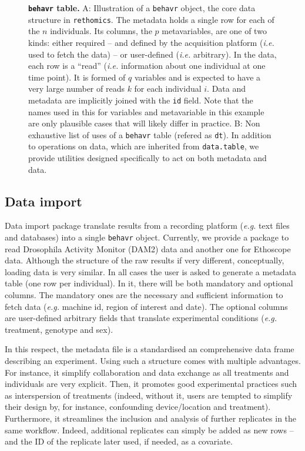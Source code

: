 \documentclass[10pt,letterpaper]{article}\usepackage[]{graphicx}\usepackage[]{color}
\begin{document}
\begin{figure}[!h]
	\caption{{\bf \texttt{behavr} table.}
	A: Illustration of a \texttt{behavr} object, the core data structure in \texttt{rethomics}.
		The metadata holds a single row for each of the $n$ individuals. 
		Its columns, the $p$ metavariables, are one of two kinds: either required -- and defined by the acquisition platform (\emph{i.e.} used to fetch the data) -- or user-defined (\emph{i.e.} arbitrary).
		In the data, each row is a ``read'' (\emph{i.e.} information about one individual at one time point).
		It is formed of $q$ variables and is expected to have a very large number of reads $k$ for each individual $i$.
		Data and metadata are implicitly joined with the \texttt{id} field.
		Note that the names used in this for variables and metavariable in this example are only plausible cases that will likely differ in practice. 
		B: Non exhaustive list of uses of a \texttt{behavr} table (refered as \texttt{dt}). 
		In addition to operations on data, which are inherited from \texttt{data.table},
		we provide utilities designed specifically to act on both metadata and data.  
	}
	\label{fig:fig-2}
\end{figure}

\subsection*{Data import}
Data import package translate results from a recording platform (\emph{e.g.} text files and databases) into a single \texttt{behavr} object.
Currently, we provide a package to read Drosophila Activity Monitor (DAM2) data and another one for Ethoscope data.
Although the structure of the raw results if very different, conceptually, loading data is very similar.
In all cases the user is asked to generate a metadata table (one row per individual). 
In it, there will be both mandatory and optional columns.
The mandatory ones are the necessary and sufficient information to fetch data (\emph{e.g.} machine id, region of interest and date). 
The optional columns are user-defined arbitrary fields that translate experimental conditions (\emph{e.g.} treatment, genotype and sex).

In this respect, the metadata file is a standardised an comprehensive data frame describing an experiment.
Using such a structure comes with multiple advantages.
For instance, it simplify collaboration and data exchange as all treatments and individuals are very explicit.
Then, it promotes good experimental practices such as interspersion of treatments (indeed, without it, users are tempted to simplify their design by, for instance, confounding device/location and treatment).
Furthermore, it streamlines the inclusion and analysis of further replicates in the same workflow.
Indeed, additional replicates can simply be added as new rows -- and the ID of the replicate later used, if needed, as a covariate.	
\end{document}
